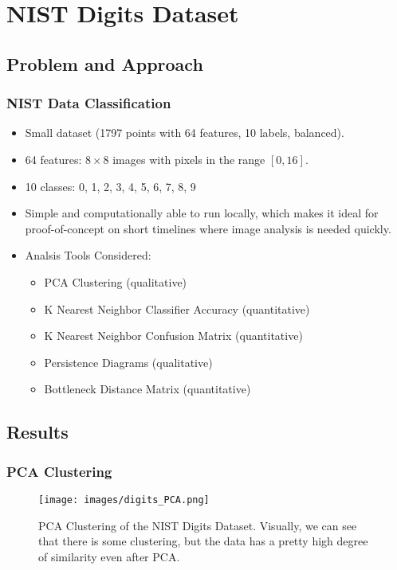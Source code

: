 \section{NIST Digits Dataset}
	\subsection{Problem and Approach}
	\begin{frame}
		\frametitle{NIST Data Classification}
		
		\begin{itemize}
			\item Small dataset (1797 points with 64 features, 10 labels, balanced).
			\item 64 features: $8\times 8$ images with pixels in the range $[0,16]$. 
			\item 10 classes: 0, 1, 2, 3, 4, 5, 6, 7, 8, 9
			\item Simple and computationally able to run locally, which makes it ideal for proof-of-concept on short timelines where image analysis is needed quickly.
			\item Analsis Tools Considered:
				\begin{itemize}
					\item PCA Clustering (qualitative)
					\item K Nearest Neighbor Classifier Accuracy (quantitative)
					\item K Nearest Neighbor Confusion Matrix (quantitative)
					\item Persistence Diagrams (qualitative)
					\item Bottleneck Distance Matrix (quantitative)
				\end{itemize}
		\end{itemize}
		
		\end{frame}
		
		
	\subsection{Results}
		
		\begin{frame}
		\frametitle{PCA Clustering}
		
		\begin{figure}
				\centering
				\texttt{[image: images/digits\_PCA.png]}
				\caption{PCA Clustering of the NIST Digits Dataset. Visually, we can see that there is some clustering, but the data has a pretty high degree of similarity even after PCA.}
		\end{figure}
		
		\end{frame}
		

